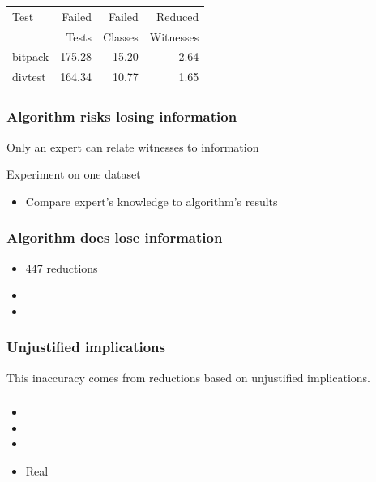 \documentclass[svgnames,14pt]{beamer}
\theoremstyle{definition}
\begin{document}
\begin{frame}
\def\?{\phantom0}
\begin{center} 
\begin{tabular}{ | l | r | r | r |}
\hline
Test & Failed & Failed  & Reduced \\
     & Tests  & Classes & Witnesses \\
\hline
bitpack & 175.28 & 15.20 & 2.64\\
divtest & 164.34 & 10.77 & 1.65\\
\hline
\end{tabular}
\end{center}
\end{frame}

\begin{frame}
\frametitle{Algorithm risks losing information}
Only an expert can relate witnesses to information

\pause

\bigskip

Experiment on one dataset
\begin{itemize}
\item  Compare expert's knowledge to algorithm's results
\end{itemize}
\end{frame}

\begin{frame}
\frametitle{Algorithm does lose information}
\begin{itemize}
\item 447 reductions
\item {}
\item {}
\end{itemize}
\end{frame}

\begin{frame}
\frametitle{Unjustified implications}
This inaccuracy comes from reductions based on unjustified implications.
\end{frame}

\begin{frame}
\frametitle{}
\begin{itemize}
\item {}
\item {}
\item {}
\item {Real}
\end{itemize}
\end{frame}
\end{document}
